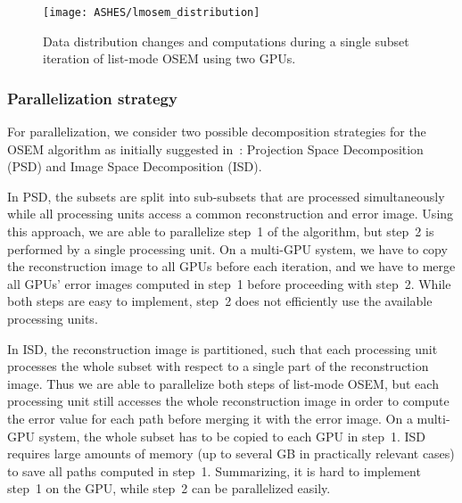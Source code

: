 \begin{figure*}[tbp]
 \centering
 \texttt{[image: ASHES/lmosem\_distribution]}
 \caption{Data distribution changes and computations during a single subset iteration of list-mode OSEM using two GPUs.}
 \label{fig:list-mode_OSEM:gpu}
\end{figure*}

\subsubsection{Parallelization strategy}
\label{sec:list-mode_OSEM:strategy}

For parallelization, we consider two possible decomposition strategies for the OSEM algorithm as initially suggested in~\cite{JJK03}: Projection Space Decomposition (PSD) and Image Space Decomposition (ISD).

In PSD, the subsets are split into sub-subsets that are processed simultaneously while all processing units access a common reconstruction and error image.
Using this approach, we are able to parallelize step~1 of the algorithm, but step~2 is performed by a single processing unit.
On a multi-GPU system, we have to copy the reconstruction image to all GPUs before each iteration, and we have to merge all GPUs' error images computed in step~1 before proceeding with step~2.
While both steps are easy to implement, step~2 does not efficiently use the available processing units.

In ISD, the reconstruction image is partitioned, such that each processing unit processes the whole subset with respect to a single part of the reconstruction image.
Thus we are able to parallelize both steps of list-mode OSEM, but each processing unit still accesses the whole reconstruction image in order to compute the error value for each path before merging it with the error image.
On a multi-GPU system, the whole subset has to be copied to each GPU in step~1.
ISD requires large amounts of memory (up to several GB in practically relevant cases) to save all paths computed in step~1.
Summarizing, it is hard to implement step~1 on the GPU, while step~2 can be parallelized easily.

